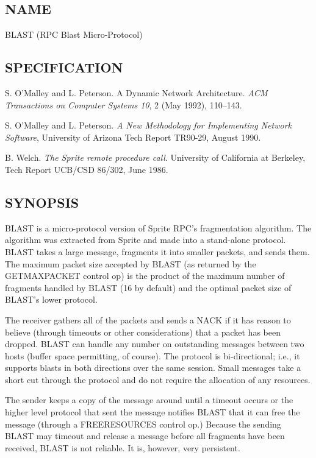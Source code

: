 %
%
%

\subsection*{NAME}

\noindent BLAST (RPC Blast Micro-Protocol)

\subsection*{SPECIFICATION}

\noindent 
S. O'Malley and L. Peterson.  A Dynamic Network Architecture.  {\it
ACM Transactions on Computer Systems 10}, 2 (May 1992), 110--143.


\medskip
\noindent  S. O'Malley and L. Peterson. {\it A New Methodology for
Implementing Network Software}, University of Arizona Tech Report
TR90-29, August 1990.

\medskip
\noindent  B. Welch. {\it The Sprite remote procedure call}. 
University of California at Berkeley, Tech Report UCB/CSD 86/302,
June 1986.

\subsection*{SYNOPSIS}

\noindent 
BLAST is a micro-protocol version of Sprite RPC's
fragmentation algorithm. The algorithm was extracted from Sprite and
made into a stand-alone protocol. BLAST takes a large message,
fragments it into smaller packets, and sends them. 
The maximum packet size accepted by BLAST (as returned by the GETMAXPACKET
control op) is the product of the maximum number of fragments handled
by BLAST (16 by default) and the optimal packet size of BLAST's lower
protocol. 

The receiver gathers all of the packets and sends a NACK if it has
reason to believe (through timeouts or other considerations) that
a packet has been dropped.
BLAST can handle any
number on outstanding messages between two hosts (buffer space
permitting, of course). The protocol is bi-directional; i.e., it
supports blasts in both directions over the same session. Small
messages take a short cut through the protocol and do not require the
allocation of any resources.  

The sender keeps a copy of the message
around until a timeout occurs or the higher level protocol that sent
the message notifies BLAST that it can free the message (through a
FREERESOURCES control op.)
Because the sending BLAST may timeout and release a message before all
fragments have been received, BLAST is not reliable. 
It is, however, very persistent.

